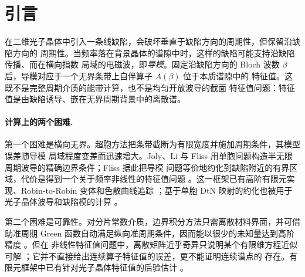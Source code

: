 \section{引言}
\label{sec:introduction}

在二维光子晶体中引入一条线缺陷，会破坏垂直于缺陷方向的周期性，但保留沿缺陷方向的
周期性。当频率落在背景晶体的谱隙中时，这样的缺陷可能支持沿缺陷传播、而在横向指数
局域的电磁波，即\emph{导模}\cite{JoannopoulosJohnsonWinnMeade2008}。固定沿缺陷方向的
Bloch 波数 $\beta$ 后，导模对应于一个无界条带上自伴算子 $A(\beta)$ 位于本质谱隙中的
特征值\cite{Fliss2013}。这既不是完整周期介质的能带计算，也不是均匀开放波导的截面
特征值问题：特征值是由缺陷诱导、嵌在无界周期背景中的离散谱。

\paragraph{计算上的两个困难.}
第一个困难是横向无界。超胞方法把条带截断为有限宽度并施加周期条件，其模型误差随导模
局域程度变差而迅速增大\cite{Fliss2013,KlindworthSchmidtFliss2014}。Joly、Li 与 Fliss
用单胞问题构造半无限周期波导的精确边界条件\cite{JolyLiFliss2006}；Fliss 据此把导模
问题等价地约化到缺陷附近的有界区域，代价是得到一个关于频率非线性的特征值问题
\cite{Fliss2013}。这一框架已有高阶有限元实现、Robin-to-Robin 变体和色散曲线追踪
\cite{KlindworthSchmidtFliss2014,FlissKlindworthSchmidt2015,Klindworth2015}；基于单胞
DtN 映射的约化也被用于光子晶体波导和缺陷模的计算
\cite{HuangLuLi2007,LiLu2007,YuanLu2007}。

第二个困难是可靠性。对分片常数介质，边界积分方法只需离散材料界面，并可借助准周期
Green 函数自动满足纵向准周期条件，因而能以很少的未知量达到高阶精度
\cite{Linton1998,BarnettGreengard2010,Kress1991,HaoBarnettMartinssonYoung2014}。但在
非线性特征值问题中，离散矩阵近乎奇异只说明某个有限维方程近似可解
\cite{GuettelTisseur2017}；它并不直接给出连续算子特征值的误差，更不能证明连续谱点的
存在。有限元框架中已有针对光子晶体特征值的后验估计
\cite{Giani2013,EngstromGianiGrubisic2016}。

